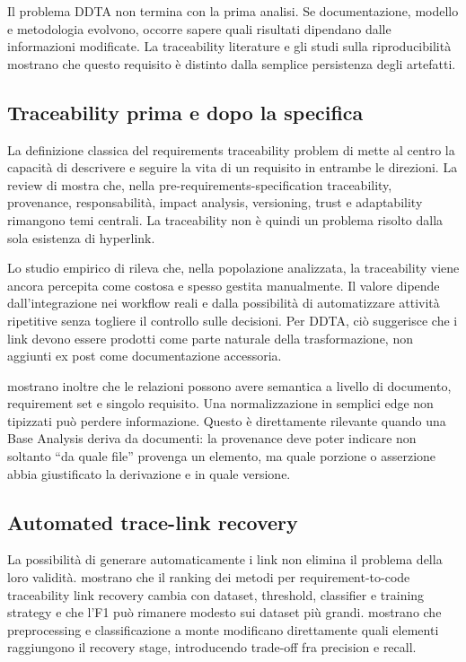 \documentclass[12pt,a4paper,oneside]{report}
\begin{document}
Il problema DDTA non termina con la prima analisi. Se documentazione, modello e metodologia evolvono, occorre sapere quali risultati dipendano dalle informazioni modificate. La traceability literature e gli studi sulla riproducibilità mostrano che questo requisito è distinto dalla semplice persistenza degli artefatti.

\subsection{Traceability prima e dopo la specifica}

La definizione classica del requirements traceability problem di \citet{gotel1994analysis} mette al centro la capacità di descrivere e seguire la vita di un requisito in entrambe le direzioni. La review di \citet{mucha2024prers} mostra che, nella pre-requirements-specification traceability, provenance, responsabilità, impact analysis, versioning, trust e adaptability rimangono temi centrali. La traceability non è quindi un problema risolto dalla sola esistenza di hyperlink.

Lo studio empirico di \citet{ruiz2023whydontwetrace} rileva che, nella popolazione analizzata, la traceability viene ancora percepita come costosa e spesso gestita manualmente. Il valore dipende dall'integrazione nei workflow reali e dalla possibilità di automatizzare attività ripetitive senza togliere il controllo sulle decisioni. Per DDTA, ciò suggerisce che i link devono essere prodotti come parte naturale della trasformazione, non aggiunti ex post come documentazione accessoria.

\citet{grosser2022documentrelations} mostrano inoltre che le relazioni possono avere semantica a livello di documento, requirement set e singolo requisito. Una normalizzazione in semplici edge non tipizzati può perdere informazione. Questo è direttamente rilevante quando una Base Analysis deriva da documenti: la provenance deve poter indicare non soltanto ``da quale file'' provenga un elemento, ma quale porzione o asserzione abbia giustificato la derivazione e in quale versione.

\subsection{Automated trace-link recovery}

La possibilità di generare automaticamente i link non elimina il problema della loro validità. \citet{wang2024rctlrsota} mostrano che il ranking dei metodi per requirement-to-code traceability link recovery cambia con dataset, threshold, classifier e training strategy e che l'F1 può rimanere modesto sui dataset più grandi. \citet{hey2024requirementsclassification} mostrano che preprocessing e classificazione a monte modificano direttamente quali elementi raggiungono il recovery stage, introducendo trade-off fra precision e recall.
\end{document}
